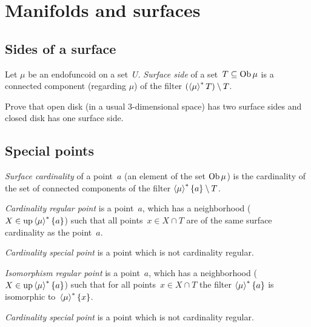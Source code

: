 \chapter{Manifolds and surfaces}

\section{Sides of a surface}

\begin{defn}
Let $\mu$ be an endofuncoid on a set~$U$.
\emph{Surface side} of a set~$T\subseteq\operatorname{Ob}\mu$ is a connected component
(regarding $\mu$) of the filter $(\left\langle \mu\right\rangle ^{\ast}T)\setminus T$.
\end{defn}

\begin{xca}
Prove that open disk (in a usual 3-dimensional space) has two surface sides
and closed disk has one surface side.
\end{xca}

\section{Special points}

\begin{defn}
\emph{Surface cardinality} of a point~$a$ (an element of the set $\operatorname{Ob}\mu$) is
the cardinality of the set of connected components of the filter
$\left\langle \mu\right\rangle ^{\ast}\{a\}\setminus T$.
\end{defn}

\begin{defn}
\emph{Cardinality regular point} is a point~$a$, which has a neighborhood
($X\in\operatorname{up}\left\langle \mu\right\rangle ^{\ast}\{a\}$) such that all points~$x\in X\cap T$
are of the same surface cardinality as the point~$a$.

\emph{Cardinality special point} is a point which is not cardinality regular.
\end{defn}

\begin{defn}
\emph{Isomorphism regular point} is a point~$a$, which has a neighborhood
($X\in\operatorname{up}\left\langle \mu\right\rangle ^{\ast}\{a\}$) such that for all points~$x\in X\cap T$
the filter $\left\langle \mu\right\rangle ^{\ast}\{a\}$ is isomorphic
to~$\left\langle \mu\right\rangle ^{\ast}\{x\}$.

\emph{Cardinality special point} is a point which is not cardinality regular.
\end{defn}

